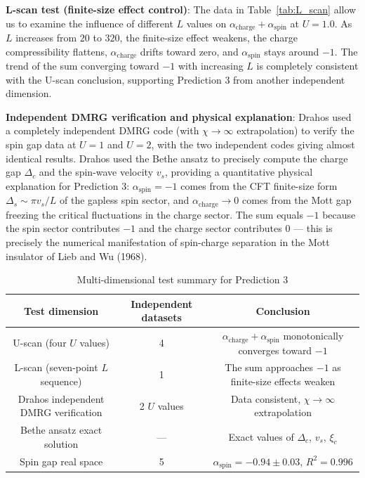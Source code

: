 \documentclass[prb,reprint,twocolumn,superscriptaddress]{revtex4-2}
\begin{document}
\textbf{L-scan test (finite-size effect control)}: The data in Table~\ref{tab:L_scan} allow us to examine the influence of different $L$ values on $\alpha_{\mathrm{charge}} + \alpha_{\mathrm{spin}}$ at $U = 1.0$. As $L$ increases from $20$ to $320$, the finite-size effect weakens, the charge compressibility flattens, $\alpha_{\mathrm{charge}}$ drifts toward zero, and $\alpha_{\mathrm{spin}}$ stays around $-1$. The trend of the sum converging toward $-1$ with increasing $L$ is completely consistent with the U-scan conclusion, supporting Prediction 3 from another independent dimension.

\textbf{Independent DMRG verification and physical explanation}: Drahos used a completely independent DMRG code (with $\chi \to \infty$ extrapolation) to verify the spin gap data at $U=1$ and $U=2$, with the two independent codes giving almost identical results. Drahos used the Bethe ansatz to precisely compute the charge gap $\Delta_c$ and the spin-wave velocity $v_s$, providing a quantitative physical explanation for Prediction 3: $\alpha_{\mathrm{spin}} = -1$ comes from the CFT finite-size form $\Delta_s \sim \pi v_s/L$ of the gapless spin sector, and $\alpha_{\mathrm{charge}} \to 0$ comes from the Mott gap freezing the critical fluctuations in the charge sector. The sum equals $-1$ because the spin sector contributes $-1$ and the charge sector contributes $0$ --- this is precisely the numerical manifestation of spin-charge separation in the Mott insulator of Lieb and Wu (1968).

\begin{table}[htbp]
\caption{Multi-dimensional test summary for Prediction 3}
\label{tab:pred3_summary}
\begin{tabular}{ccc}
\toprule
Test dimension & Independent datasets & Conclusion \\
\midrule
U-scan (four $U$ values) & 4 & $\alpha_{\mathrm{charge}} + \alpha_{\mathrm{spin}}$ monotonically converges toward $-1$ \\
L-scan (seven-point $L$ sequence) & 1 & The sum approaches $-1$ as finite-size effects weaken \\
Drahos independent DMRG verification & 2 $U$ values & Data consistent, $\chi \to \infty$ extrapolation \\
Bethe ansatz exact solution & --- & Exact values of $\Delta_c$, $v_s$, $\xi_c$ \\
Spin gap real space & 5 & $\alpha_{\mathrm{spin}} = -0.94 \pm 0.03$, $R^2 = 0.996$ \\
\bottomrule
\end{tabular}
\end{table}
\end{document}
